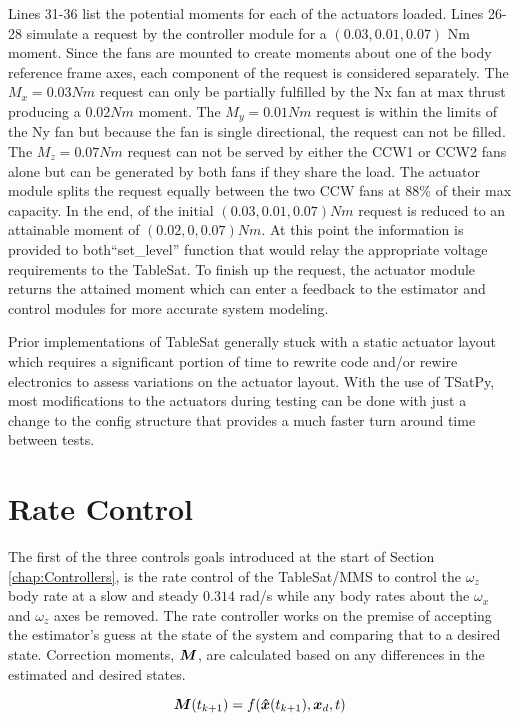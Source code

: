Lines 31-36 list the potential moments for each of the actuators loaded.  Lines 26-28 simulate a request by the controller module for a $(0.03, 0.01, 0.07)$ Nm moment.  Since the fans are mounted to create moments about one of the body reference frame axes, each component of the request is considered separately.  The $M_x = 0.03 Nm$ request can only be partially fulfilled by the Nx fan at max thrust producing a $0.02 Nm$ moment.  The $M_y = 0.01 Nm$ request is within the limits of the Ny fan but because the fan is single directional, the request can not be filled.  The $M_z = 0.07 Nm$ request can not be served by either the CCW1 or CCW2 fans alone but can be generated by both fans if they share the load.  The actuator module splits the request equally between the two CCW fans at 88\% of their max capacity.  In the end, of the initial $(0.03, 0.01, 0.07) Nm$ request is reduced to an attainable moment of $(0.02, 0, 0.07) Nm$.  At this point the information is provided to both``set\_level'' function that would relay the appropriate voltage requirements to the TableSat.  To finish up the request, the actuator module returns the attained moment which can enter a feedback to the estimator and control modules for more accurate system modeling.


Prior implementations of TableSat generally stuck with a static actuator layout which requires a significant portion of time to rewrite code and/or rewire electronics to assess variations on the actuator layout.  With the use of TSatPy, most modifications to the actuators during testing can be done with just a change to the config structure that provides a much faster turn around time between tests.

\section{Rate Control}
\label{sec:RateControl}

The first of the three controls goals introduced at the start of Section \ref{chap:Controllers}, is the rate control of the TableSat/MMS to control the $\omega_z$ body rate at a slow and steady $0.314$ rad/s while any body rates about the $\omega_x$ and $\omega_z$ axes be removed.  The rate controller works on the premise of accepting the estimator's guess at the state of the system and comparing that to a desired state.  Correction moments, $\boldsymbol{M}$, are calculated based on any differences in the estimated and desired states.

\begin{equation}
  \boldsymbol{M}(t_{k+1}) = f(\boldsymbol{\hat{x}}(t_{k+1}), \boldsymbol{x}_d, t)
  \label{eqn:GeneralRateControl}
\end{equation}

